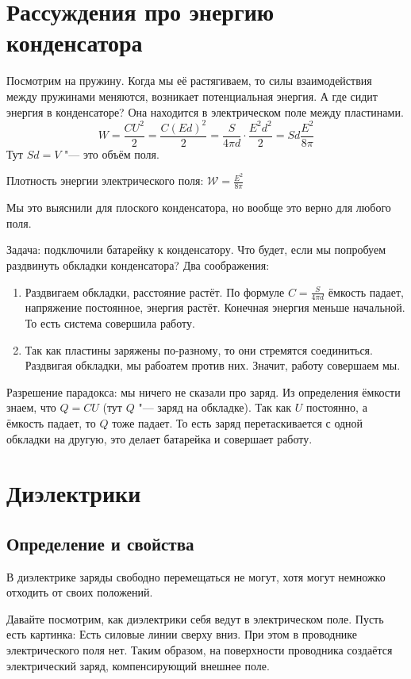
\section{Рассуждения про энергию конденсатора}
    Посмотрим на пружину.
    Когда мы её растягиваем, то силы взаимодействия между пружинами
    меняются, возникает потенциальная энергия.
    А где сидит энергия в конденсаторе?
    Она находится в электрическом поле между пластинами.
    \[ W = \frac{CU^2}2 = \frac{C(Ed)^2}2 = \frac{S}{4\pi d}\cdot\frac{E^2d^2}{2} = Sd \frac{E^2}{8\pi} \]
    Тут $Sd=V$ "--- это объём поля. 
    \begin{Def}
      Плотность энергии электрического поля: $\mathcal{W} = \frac{E^2}{8\pi}$
    \end{Def}
    \begin{Rem}
      Мы это выяснили для плоского конденсатора, но вообще это верно для любого поля.
    \end{Rem}

    Задача: подключили батарейку к конденсатору.
    Что будет, если мы попробуем раздвинуть обкладки конденсатора?
    Два соображения:
    \begin{enumerate}
    \item Раздвигаем обкладки, расстояние растёт.
          По формуле $C=\frac{S}{4\pi d}$ ёмкость падает, напряжение постоянное, энергия растёт.
          Конечная энергия меньше начальной.
          То есть система совершила работу.
    \item Так как пластины заряжены по-разному, то они стремятся соединиться.
          Раздвигая обкладки, мы рабоатем против них.
          Значит, работу совершаем мы.
    \end{enumerate}
    Разрешение парадокса: мы ничего не сказали про заряд.
    Из определения ёмкости знаем, что $Q=CU$ (тут $Q$ "--- заряд на обкладке).
    Так как $U$ постоянно, а ёмкость падает, то $Q$ тоже падает.
    То есть заряд перетаскивается с одной обкладки на другую, это делает батарейка и совершает работу.

\section{Диэлектрики}
  \subsection{Определение и свойства}
    \begin{Def}
      В диэлектрике заряды свободно перемещаться не могут, хотя могут немножко отходить от своих положений.
    \end{Def}
    Давайте посмотрим, как диэлектрики себя ведут в электрическом поле.
    Пусть есть картинка:
    Есть силовые линии сверху вниз.
    При этом в проводнике электрического поля нет.
    Таким образом, на поверхности проводника создаётся электрический заряд, компенсирующий внешнее поле.

